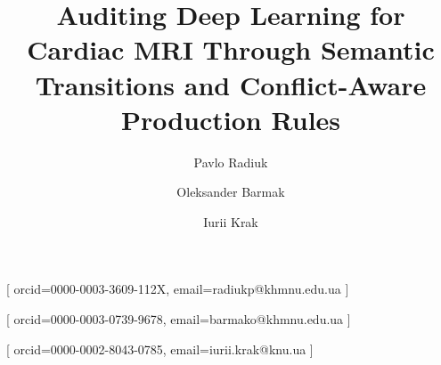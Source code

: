 \documentclass{ceurart}
\begin{document}


\title{Auditing Deep Learning for Cardiac MRI Through Semantic Transitions and Conflict-Aware Production Rules}

\author[1]{Pavlo Radiuk}[%
  orcid=0000-0003-3609-112X,
  email=radiukp@khmnu.edu.ua
]
\cormark[1]

\author[1]{Oleksander Barmak}[%
  orcid=0000-0003-0739-9678,
  email=barmako@khmnu.edu.ua
]

\author[2,3]{Iurii Krak}[%
  orcid=0000-0002-8043-0785,
  email=iurii.krak@knu.ua
]

\address[1]{Khmelnytskyi National University, 11, Institutes str., Khmelnytskyi, 29016, Ukraine}
\address[2]{Taras Shevchenko National University of Kyiv, 64/13, Volodymyrska str., Kyiv, 01601, Ukraine}
\address[3]{V.M. Glushkov Institute of Cybernetics, 40, Glushkov Ave., Kyiv, 03187, Ukraine}

\end{document}
